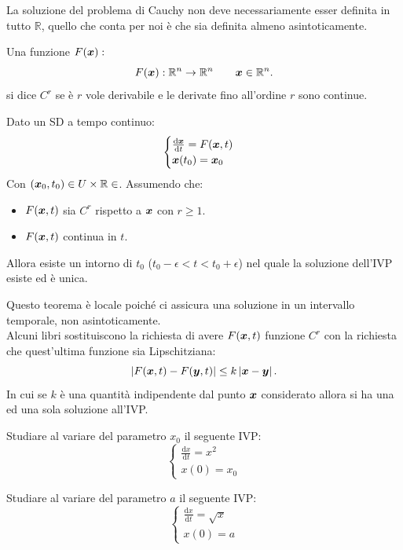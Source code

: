 \noindent
La soluzione del problema di Cauchy non deve necessariamente esser definita in tutto $\mathbb{R}$, quello che conta per noi è che sia definita almeno asintoticamente.
\begin{defn}[Funzione $C^r$]
    Una funzione $F(\boldsymbol{x}):$
    \[
	F(\boldsymbol{x}): \mathbb{R}^n\to \mathbb{R}^n \qquad \boldsymbol{x}\in \mathbb{R}^n
    .\] si dice $C^r$ se è $r$ vole derivabile e le derivate fino all'ordine $r$ sono continue.
\end{defn}
\noindent
\begin{thm}
   Dato un SD a tempo continuo:
   \[
       \begin{cases}
	   \frac{\text{d} \boldsymbol{x}}{\text{d} t} = F(\boldsymbol{x}, t)\\
	   \boldsymbol{x} (t_0) = \boldsymbol{x}_0
       \end{cases}
   \] 
   Con $\left(\boldsymbol{x}_0, t_0\right) \in U\times \mathbb{R} \in $. Assumendo che:
   \begin{itemize}
       \item $F(\boldsymbol{x},t)$ sia $C^r$ rispetto a $\boldsymbol{x}$ con $r\ge 1$.
       \item $F(\boldsymbol{x}, t)$ continua in $t$.
   \end{itemize}
   Allora esiste un intorno di $t_0$ ($t_0-\epsilon  < t < t_0+\epsilon$) nel quale la soluzione dell'IVP esiste ed è unica.
\end{thm}
\noindent
Questo teorema è locale poiché ci assicura una soluzione in un intervallo temporale, non asintoticamente.\\
Alcuni libri sostituiscono la richiesta di avere $F(\boldsymbol{x}, t)$ funzione $C^r$ con la richiesta che quest'ultima funzione sia Lipschitziana:
\[
    \left|F(\boldsymbol{x}, t)-F(\boldsymbol{y}, t)\right| \le k \left|\boldsymbol{x}-\boldsymbol{y}\right|
.\] 
In cui se $k$  è una quantità indipendente dal punto $\boldsymbol{x}$  considerato allora si ha una ed una sola soluzione all'IVP.
\begin{ex}[Esercizio]
    Studiare al variare del parametro $x_0$  il seguente IVP:
    \[
        \begin{cases}
            \frac{\text{d} x}{\text{d} t} = x^2\\
	    x(0) = x_0
        \end{cases}
    \] 
\end{ex}
\noindent
\begin{ex}[Esercizio]
    Studiare al variare del parametro $a$ il seguente IVP:
    \[
        \begin{cases}
            \frac{\text{d} x}{\text{d} t} = \sqrt{x} \\
	    x(0)=a
        \end{cases}
    \] 
\end{ex}
